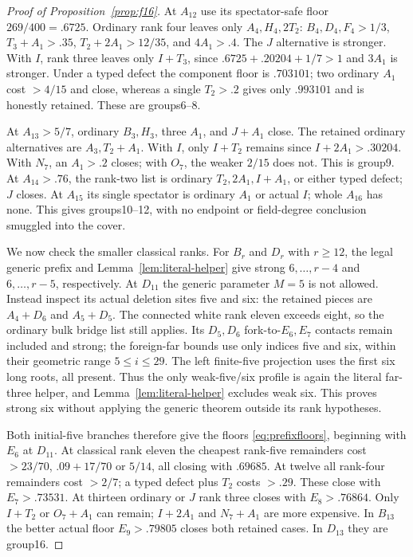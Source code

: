 \documentclass[11pt]{article}
\begin{document}
\begin{proof}[Proof of Proposition~\ref{prop:f16}]
At $A_{12}$ use its spectator-safe floor $269/400=.6725$.
Ordinary rank four leaves only $A_4,H_4,2T_2$:
$B_4,D_4,F_4>1/3$, $T_3+A_1>.35$,
$T_2+2A_1>12/35$, and $4A_1>.4$.
The $J$ alternative is stronger. With $I$, rank three leaves only
$I+T_3$, since $.6725+.20204+1/7>1$ and $3A_1$ is stronger.
Under a typed defect the component floor is $.703101$;
two ordinary $A_1$ cost $>4/15$ and close, whereas a single
$T_2>.2$ gives only $.993101$ and is honestly retained.
These are groups6--8.

At $A_{13}>5/7$, ordinary $B_3,H_3$, three $A_1$, and $J+A_1$
close. The retained ordinary alternatives are $A_3,T_2+A_1$.
With $I$, only $I+T_2$ remains since $I+2A_1>.30204$.
With $N_7$, an $A_1>.2$ closes; with $O_7$, the weaker $2/15$
does not. This is group9. At $A_{14}>.76$, the rank-two list is
ordinary $T_2,2A_1,I+A_1$, or either typed defect; $J$ closes.
At $A_{15}$ its single spectator is ordinary $A_1$ or actual $I$;
whole $A_{16}$ has none. This gives groups10--12, with no endpoint
or field-degree conclusion smuggled into the cover.

We now check the smaller classical ranks. For $B_r$ and $D_r$ with
$r\ge12$, the legal generic prefix and
Lemma~\ref{lem:literal-helper} give strong $6,\ldots,r-4$ and
$6,\ldots,r-5$, respectively. At $D_{11}$ the generic parameter
$M=5$ is not allowed. Instead inspect its actual deletion sites five
and six: the retained pieces are $A_4+D_6$ and $A_5+D_5$.
The connected white rank eleven exceeds eight, so the ordinary bulk
bridge list still applies. Its $D_5,D_6$ fork-to-$E_6,E_7$ contacts
remain included and strong; the foreign-far bounds use only indices
five and six, within their geometric range $5\le i\le29$.
The left finite-five projection uses the first six long roots, all
present. Thus the only weak-five/six profile is again the literal
far-three helper, and Lemma~\ref{lem:literal-helper} excludes weak six.
This proves strong six without applying the generic theorem outside
its rank hypotheses.

Both initial-five branches therefore give the floors
\eqref{eq:prefixfloors}, beginning with $E_6$ at $D_{11}$.
At classical rank eleven the cheapest rank-five remainders cost
$>23/70$, $.09+17/70$ or $5/14$, all closing with $.69685$.
At twelve all rank-four remainders cost $>2/7$; a typed defect plus
$T_2$ costs $>.29$. These close with $E_7>.73531$.
At thirteen ordinary or $J$ rank three closes with $E_8>.76864$.
Only $I+T_2$ or $O_7+A_1$ can remain; $I+2A_1$ and $N_7+A_1$
are more expensive. In $B_{13}$ the better actual floor
$E_9>.79805$ closes both retained cases. In $D_{13}$ they are
group16.


\end{proof}
\end{document}
